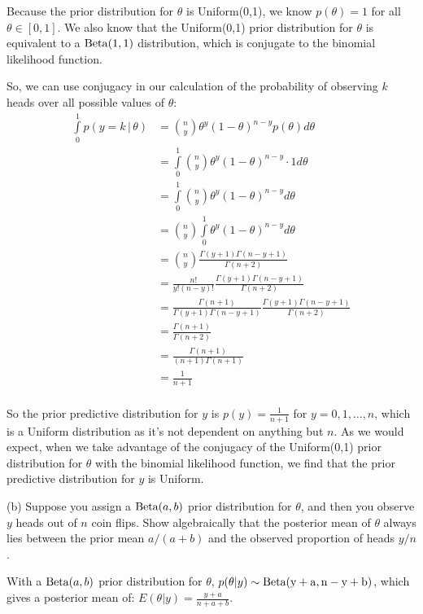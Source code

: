 \documentclass[12pt]{article}
\begin{document}
Because the prior distribution for $\theta$ is Uniform(0,1), we know $p(\theta) = 1$ for all $\theta \in [0,1]$.
We also know that the Uniform(0,1) prior distribution for $\theta$ is equivalent to a ${\rm Beta}(1,1)$ distribution,
which is conjugate to the binomial likelihood function.

So, we can use conjugacy in our calculation of the probability of observing $k$ heads over all possible values of $\theta$:
\begin{align*}
\int\limits_0^1 p(y = k \, | \, \theta) &= \binom{n}{y}\theta^y\left(1 - \theta\right)^{n-y} p(\theta) d\theta \\
&= \int\limits_0^1 \binom{n}{y}\theta^y\left(1 - \theta\right)^{n-y} \cdot 1 d\theta \\
&= \int\limits_0^1 \binom{n}{y}\theta^y\left(1 - \theta\right)^{n-y}d\theta \\
&= \binom{n}{y} \int\limits_0^1 \theta^y\left(1 - \theta\right)^{n-y}d\theta \\
&= \binom{n}{y} \frac{\Gamma(y + 1) \Gamma(n - y + 1)}{\Gamma(n + 2)} \\
&= \frac{n!}{y!\left(n-y\right)!} \frac{\Gamma(y + 1) \Gamma(n - y + 1)}{\Gamma(n + 2)} \\
&= \frac{\Gamma(n+1)}{\Gamma(y+1)\Gamma(n-y+1)} \frac{\Gamma(y + 1) \Gamma(n - y + 1)}{\Gamma(n + 2)} \\
&= \frac{\Gamma(n+1)}{\Gamma(n + 2)} \\
&= \frac{\Gamma(n+1)}{(n + 1)\Gamma(n + 1)} \\
&= \frac{1}{n + 1} \\
\end{align*}

So the prior predictive distribution for $y$ is $p(y) = \frac{1}{n + 1}$ for $y = 0,1,\ldots,n$, which is a Uniform distribution as it's not dependent on anything but $n$. As we would expect, when we take advantage of the conjugacy of the Uniform(0,1) prior distribution for $\theta$ with the binomial likelihood function,
we find that the prior predictive distribution for $y$ is Uniform.

(b) Suppose you assign a ${\rm Beta}(a, b)$ prior distribution for $\theta$, and then you observe $y
$ heads out of $n$ coin flips.  Show algebraically that the posterior mean of $\theta$ always lies between the prior mean $a/(a+b)$ and the observed proportion of heads $y/n$.

With a ${\rm Beta}(a, b)$ prior distribution for $\theta$, $p(\theta | y) \sim \rm Beta(y + a, n - y + b)$,
which gives a posterior mean of: $E(\theta | y) = \frac{y + a}{n + a + b}$.
\end{document}

